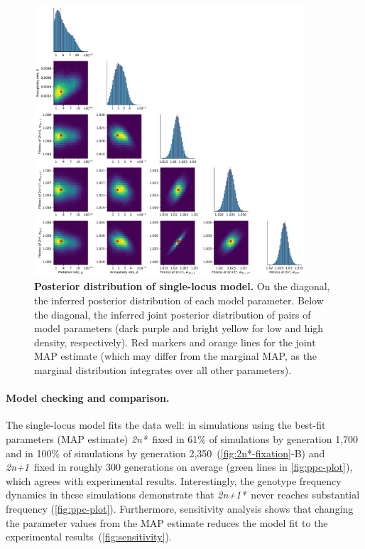 \documentclass[12pt]{extarticle}
\newcommand{\anwt}{\emph{2n+1}}
\newcommand{\eumt}{\emph{2n*}}
\newcommand{\anmt}{\emph{2n+1*}}
\begin{document}
\begin{figure}[h!]
  \centering
\includegraphics[width=0.9\textwidth]{../figures/posterior.pdf}
  \caption{
  \textbf{Posterior distribution of single-locus model.}
On the diagonal, the inferred posterior distribution of each model parameter. 
Below the diagonal, the inferred joint posterior distribution of pairs of model parameters (dark purple and bright yellow for low and high density, respectively). Red markers and orange lines for the joint MAP estimate (which may differ from the marginal MAP, as the marginal distribution integrates over all other parameters).
} 
  \label{fig:posterior}
\end{figure}


\paragraph{Model checking and comparison.}
The single-locus model fits the data well: in simulations using the best-fit parameters (MAP estimate) \eumt\ fixed in 61\% of simulations by generation 1,700 and in 100\% of simulations by generation 2,350~(\autoref{fig:2n*-fixation}-B) and \anwt\ fixed in roughly 300 generations on average (green lines in \autoref{fig:ppc-plot}), which agrees with experimental results.
Interestingly, the genotype frequency dynamics in these simulations demonstrate that \anmt\ never reaches substantial frequency (\autoref{fig:ppc-plot}). %
Furthermore, sensitivity analysis shows that changing the parameter values from the MAP estimate reduces the model fit to the experimental results~(\autoref{fig:sensitivity}).
\end{document}
